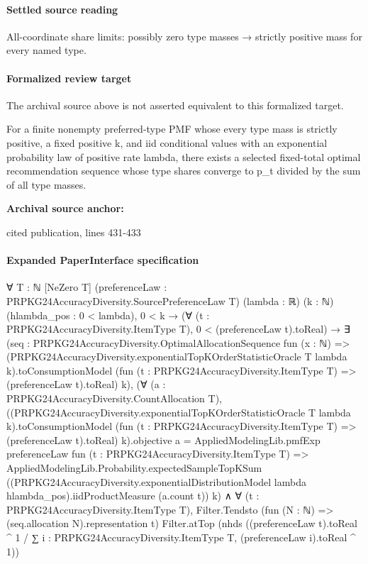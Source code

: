\documentclass[10pt]{article}
\begin{document}
\paragraph{Settled source reading}
\begin{sloppypar}
All-\allowbreak{}coordinate share limits:\allowbreak{} possibly zero type masses → strictly positive mass for every named type.\allowbreak{}
\end{sloppypar}
\paragraph{Formalized review target}
The archival source above is not asserted equivalent to this formalized target.
\begin{ReviewVerbatim}
For a finite nonempty preferred-type PMF whose every type mass is strictly positive, a fixed positive k, and iid conditional values with an exponential probability law of positive rate lambda, there exists a selected fixed-total optimal recommendation sequence whose type shares converge to p_t divided by the sum of all type masses.
\end{ReviewVerbatim}

\textbf{Archival source anchor:} {\footnotesize\raggedright cited publication, lines 431-\allowbreak{}433\par}
\paragraph{Expanded PaperInterface specification}
\begin{ReviewVerbatim}
∀ {T : ℕ} [NeZero T] (preferenceLaw : PRPKG24AccuracyDiversity.SourcePreferenceLaw T) (lambda : ℝ) (k : ℕ)
  (hlambda_pos : 0 < lambda),
  0 < k →
    (∀ (t : PRPKG24AccuracyDiversity.ItemType T), 0 < (preferenceLaw t).toReal) →
      ∃ (seq :
        PRPKG24AccuracyDiversity.OptimalAllocationSequence fun (x : ℕ) =>
          (PRPKG24AccuracyDiversity.exponentialTopKOrderStatisticOracle T lambda k).toConsumptionModel
            (fun (t : PRPKG24AccuracyDiversity.ItemType T) => (preferenceLaw t).toReal) k),
        (∀ (a : PRPKG24AccuracyDiversity.CountAllocation T),
            ((PRPKG24AccuracyDiversity.exponentialTopKOrderStatisticOracle T lambda k).toConsumptionModel
                    (fun (t : PRPKG24AccuracyDiversity.ItemType T) => (preferenceLaw t).toReal) k).objective
                a =
              AppliedModelingLib.pmfExp preferenceLaw fun (t : PRPKG24AccuracyDiversity.ItemType T) =>
                AppliedModelingLib.Probability.expectedSampleTopKSum
                  ((PRPKG24AccuracyDiversity.exponentialDistributionModel lambda hlambda_pos).iidProductMeasure
                    (a.count t))
                  k) ∧
          ∀ (t : PRPKG24AccuracyDiversity.ItemType T),
            Filter.Tendsto (fun (N : ℕ) => (seq.allocation N).representation t) Filter.atTop
              (nhds
                ((preferenceLaw t).toReal ^ 1 /
                  ∑ i : PRPKG24AccuracyDiversity.ItemType T, (preferenceLaw i).toReal ^ 1))
\end{ReviewVerbatim}
\end{document}
